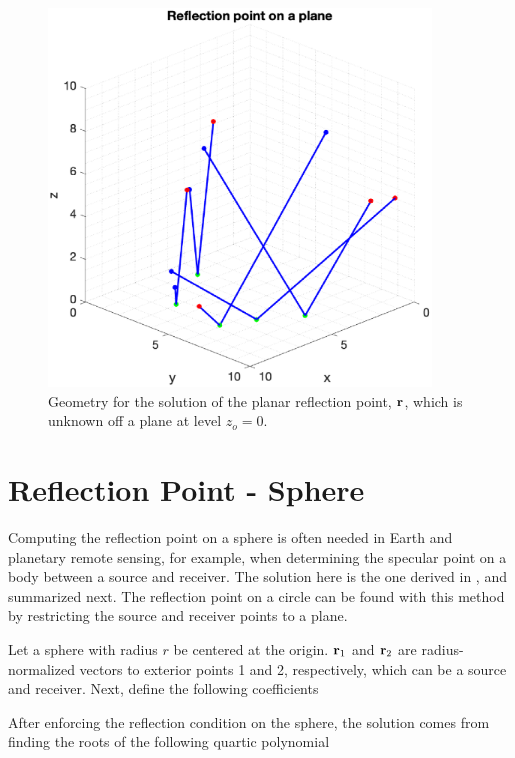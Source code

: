 \begin{figure}[H] 
   \centering
   \includegraphics[width=4in]{ReflectionRefraction/Figures/reflectionraysplane} 
   \caption{Geometry for the solution of the planar reflection point, $\mathbf{r}$, which is unknown off a plane at level $z_o = 0$.}
\end{figure}


{\footnotesize
{}
}


\section{Reflection Point - Sphere}

Computing the reflection point on a sphere is often needed in Earth and planetary remote sensing, for example, when determining the specular point on a body between a source and receiver. The solution here is the one derived in \cite{reflection_sphere}, and summarized next. The reflection point on a circle can be found with this method by restricting the source and receiver points to a plane.

Let a sphere with radius $r$ be centered at the origin. $\mathbf{r}_1$ and $\mathbf{r}_2$ are radius-normalized vectors to exterior points 1 and 2, respectively, which can be a source and receiver.  Next, define the following coefficients 

After enforcing the reflection condition on the sphere, the solution comes from finding the roots of the following quartic polynomial

